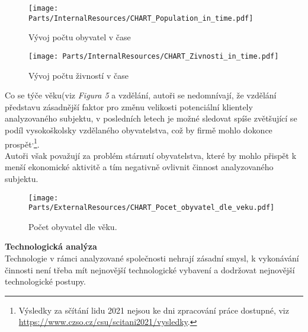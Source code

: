 \begin{figure}[!hbtp]
	\centering
	\texttt{[image: Parts/InternalResources/CHART\_Population\_in\_time.pdf]}
	\caption[Vývoj počtu obyvatel v čase]{Vývoj počtu obyvatel v čase}
	\label{fig:Vyvoj poctu obyvatel v case}
\end{figure}

\newpage

\begin{figure}[!hbtp]
	\centering
	\texttt{[image: Parts/InternalResources/CHART\_Zivnosti\_in\_time.pdf]}
	\caption[Vývoj počtu živností v čase]{Vývoj počtu živností v čase}
	\label{fig:Vyvoj poctu zivnosti v case}
\end{figure}

Co se týče věku(viz \textit{Figura 5} a vzdělání, autoři se nedomnívají, že vzdělání představu zásadnější faktor pro změnu velikosti potenciální klientely analyzovaného subjektu, v posledních letech je možné sledovat spíše zvětšující se podíl vysokoškolsky vzdělaného obyvatelstva, což by firmě mohlo dokonce prospět\textsuperscript{,}\footnote{Výsledky za sčítání lidu 2021 nejsou ke dni zpracování práce dostupné, viz \url{https://www.czso.cz/csu/scitani2021/vysledky}.}.\\

Autoři však považují za problém stárnutí obyvatelstva, které by mohlo přispět k menší ekonomické aktivitě a tím negativně ovlivnit činnost analyzovaného subjektu.\\

\newpage

\begin{figure}[!hbtp]
	\centering
	\texttt{[image: Parts/ExternalResources/CHART\_Pocet\_obyvatel\_dle\_veku.pdf]}
	\caption[Počet obyvatel dle věku]{Počet obyvatel dle věku.}
	\label{fig:Pocet obyvatel dle veku}
\end{figure}




\noindent\textbf{Technologická analýza}\\

Technologie v rámci analyzované společnosti nehrají zásadní smysl, k vykonávání činnosti není třeba mít nejnovější technologické vybavení a dodržovat nejnovější technologické postupy.\\

